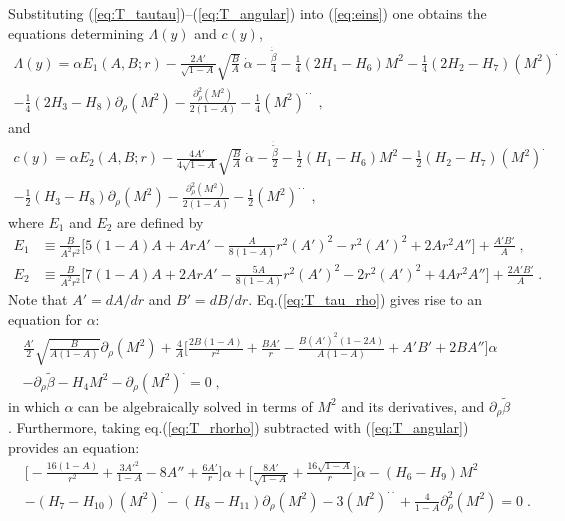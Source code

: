 \documentclass[a4paper,11pt]{article}
\numberwithin{equation}{section}
\begin{document}
Substituting (\ref{eq:T_tautau})--(\ref{eq:T_angular}) into (\ref{eq:eins}) one obtains the equations determining $\Lambda(y)$ and $c(y)$,
\begin{align}
\Lambda(y) = \alpha E_1(A,B;r) - \frac{2 A'}{\sqrt{1 - A}}\sqrt{\frac{B}{A}}~\dot{\alpha} - \frac{\dot{\tilde{\beta}}}{4} - \frac{1}{4} (2H_1 - H_6) M^2 - \frac{1}{4} (2H_2 - H_7) (M^2)^\cdot \nonumber \\  - \frac{1}{4} (2H_3 - H_8) \partial_\rho(M^2)  - \frac{\partial_\rho^2(M^2)}{2(1 - A)} - \frac{1}{4} (M^2)^{\cdot\cdot} \;, \label{eq:tadpole_Lambda}
\end{align}
and
\begin{align}
c(y) = \alpha E_2(A,B;r) - \frac{ 4 A'}{4\sqrt{1 - A}}\sqrt{\frac{B}{A}}~\dot{\alpha} - \frac{\dot{\tilde{\beta}}}{2} - \frac{1}{2} (H_1 - H_6) M^2 - \frac{1}{2} (H_2 - H_7) (M^2)^\cdot \nonumber \\ - \frac{1}{2} (H_3 - H_8) \partial_\rho(M^2)  - \frac{\partial_\rho^2(M^2)}{2(1 - A)} - \frac{1}{2} (M^2)^{\cdot\cdot} \;, \label{eq:tadpole_c}
\end{align}
where $E_1$ and $E_2$ are defined by
\begin{align}
E_1 &\equiv  \frac{B}{A^2r^2} \bigg[5(1 - A)A +  A r A' - \frac{A}{8(1 - A)} r^2 (A')^2 - r^2 (A')^2 + 2 A r^2 A'' \bigg] + \frac{A' B'}{ A} \;, \\
E_2 &\equiv \frac{B}{A^2r^2} \bigg[7(1 - A)A + 2 A r A' - \frac{5A}{8(1 - A)} r^2 (A')^2 - 2 r^2 (A')^2 + 4 A r^2 A'' \bigg] + \frac{2 A' B'}{A} \;.
\end{align}
Note that $A' = dA/dr$ and $B' = dB/dr$. Eq.(\ref{eq:T_tau_rho}) gives rise to an equation for $\alpha$:
\begin{align}
\frac{A'}{2} \sqrt{\frac{B}{A(1 - A)}} \partial_\rho(M^2) + \frac{4}{A}\bigg[\frac{2B(1 - A)}{r^2} + \frac{B A'}{r} - \frac{B (A')^2 (1 - 2A)}{A (1 - A)} + A'B' + 2 B A'' \bigg] \alpha \nonumber \\ - \partial_\rho\tilde{\beta} - H_4 M^2 - \partial_\rho(M^2)^\cdot = 0 \;, \label{eq:alpha_EFT}
\end{align}
in which $\alpha$ can be algebraically solved in terms of $M^2$ and its derivatives, and $\partial_\rho\tilde{\beta}$. Furthermore, taking eq.(\ref{eq:T_rhorho}) subtracted with (\ref{eq:T_angular}) provides an equation:
\begin{align}
&\bigg[-\frac{16(1 - A)}{r^2} + \frac{3 A'^2}{1 - A} - 8 A'' + \frac{6 A'}{r} \bigg]\alpha  + \bigg[\frac{8 A' }{\sqrt{1 - A}} + \frac{16 \sqrt{1 - A}}{r} \bigg]\dot{\alpha}  - (H_6 - H_9) M^2  \nonumber \\ 
& - (H_7 - H_{10}) (M^2)^\cdot - (H_8 - H_{11}) \partial_\rho (M^2) - 3 (M^2)^{\cdot\cdot} + \frac{4}{1 - A} \partial^2_\rho (M^2) = 0 \;. \label{eq:beta_EFT}
\end{align}
\end{document}

